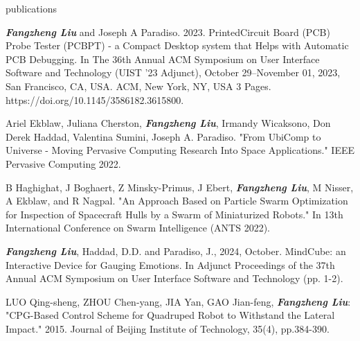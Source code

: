\documentclass{resume} %
\begin{document}
\begin{rSection}{publications}
\begin{itemlabel}
\item \textbf{\textit{Fangzheng Liu}} and Joseph A Paradiso. 2023.
PrintedCircuit Board (PCB) Probe Tester (PCBPT) - a Compact Desktop system that Helps with Automatic PCB Debugging.
In The 36th Annual ACM Symposium on User Interface Software and Technology (UIST '23 Adjunct),
October 29--November 01, 2023, San Francisco, CA, USA. ACM, New York, NY, USA 3 Pages. https://doi.org/10.1145/3586182.3615800.
\smallskip
\smallskip


\item Ariel Ekblaw, Juliana Cherston, \textbf{\textit{Fangzheng Liu}}, Irmandy Wicaksono, Don Derek Haddad, Valentina Sumini, Joseph A. Paradiso.
"From UbiComp to Universe - Moving Pervasive Computing Research Into Space Applications."
IEEE Pervasive Computing 2022.
\smallskip
\smallskip

\item B Haghighat, J Boghaert, Z Minsky-Primus, J Ebert, \textbf{\textit{Fangzheng Liu}}, M Nisser, A Ekblaw, and R Nagpal.
"An Approach Based on Particle Swarm Optimization for Inspection of Spacecraft Hulls by a Swarm of Miniaturized Robots."
In 13th International Conference on Swarm Intelligence (ANTS 2022).
\smallskip
\smallskip

\item \textbf{\textit{Fangzheng Liu}}, Haddad, D.D. and Paradiso, J., 2024, October.
MindCube: an Interactive Device for Gauging Emotions.
In Adjunct Proceedings of the 37th Annual ACM Symposium on User Interface Software and Technology (pp. 1-2).
\smallskip
\smallskip

\item LUO Qing-sheng, ZHOU Chen-yang, JIA Yan, GAO Jian-feng, \textbf{\textit{Fangzheng Liu}}:
"CPG-Based Control Scheme for Quadruped Robot to Withstand the Lateral Impact."
2015. Journal of Beijing Institute of Technology, 35(4), pp.384-390.
\end{itemlabel}
\end{rSection}
\end{document}
